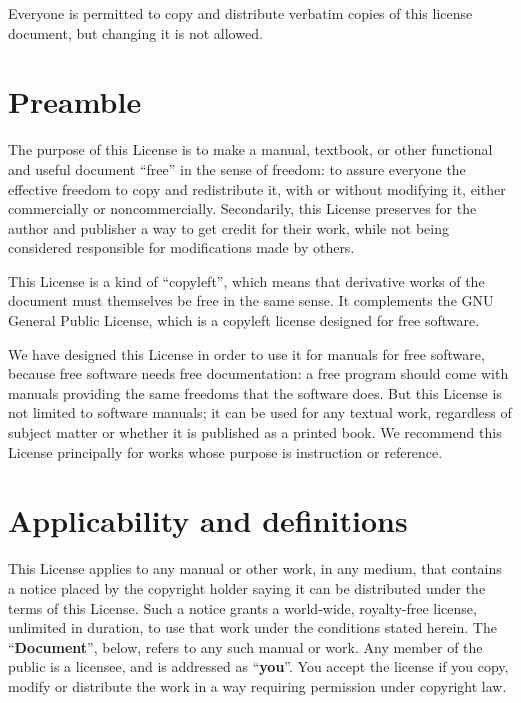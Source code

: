 Everyone is permitted to copy and distribute verbatim copies of this
license document, but changing it is not allowed.

\def\thesection{\arabic{section}.}
\setcounter{section}{-1}

\section{Preamble}

The purpose of this License is to make a manual, textbook, or other
functional and useful document ``free'' in the sense of freedom: to
assure everyone the effective freedom to copy and redistribute it,
with or without modifying it, either commercially or noncommercially.
Secondarily, this License preserves for the author and publisher a way
to get credit for their work, while not being considered responsible
for modifications made by others.

This License is a kind of ``copyleft'', which means that derivative
works of the document must themselves be free in the same sense.  It
complements the GNU General Public License, which is a copyleft
license designed for free software.

We have designed this License in order to use it for manuals for free
software, because free software needs free documentation: a free
program should come with manuals providing the same freedoms that the
software does.  But this License is not limited to software manuals;
it can be used for any textual work, regardless of subject matter or
whether it is published as a printed book.  We recommend this License
principally for works whose purpose is instruction or reference.


\section{Applicability and definitions}

This License applies to any manual or other work, in any medium, that
contains a notice placed by the copyright holder saying it can be
distributed under the terms of this License.  Such a notice grants a
world-wide, royalty-free license, unlimited in duration, to use that
work under the conditions stated herein.  The ``\textbf{Document}'', below,
refers to any such manual or work.  Any member of the public is a
licensee, and is addressed as ``\textbf{you}''.  You accept the license if you
copy, modify or distribute the work in a way requiring permission
under copyright law.

